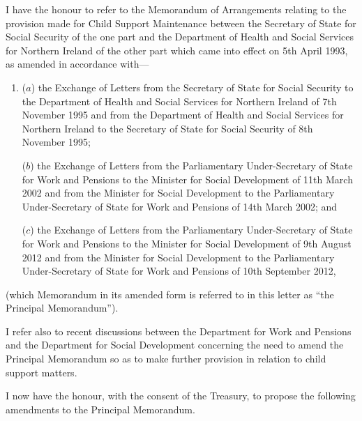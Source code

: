 \documentclass[12pt,a4paper]{article}
\begin{document}
I have the honour to refer to the Memorandum of Arrangements relating to the provision 
made for Child Support Maintenance between the Secretary of State for Social Security of 
the one part and the Department of Health and Social Services for Northern Ireland of the 
other part which came into effect on 5th April 1993, as amended in accordance with---
\begin{enumerate}\item[] 
($a$) the Exchange of Letters from the Secretary of State for Social Security to the 
Department of Health and Social Services for Northern Ireland of 7th November 
1995 and from the Department of Health and Social Services for Northern Ireland 
to the Secretary of State for Social Security of 8th November 1995;

($b$) the Exchange of Letters from the Parliamentary Under-Secretary of State for Work
and Pensions to the Minister for Social Development of 11th March 2002 and from
the Minister for Social Development to the Parliamentary Under-Secretary of State
for Work and Pensions of 14th March 2002; and

($c$) the Exchange of Letters from the Parliamentary Under-Secretary of State for Work
and Pensions to the Minister for Social Development of 9th August 2012 and from
the Minister for Social Development to the Parliamentary Under-Secretary of State
for Work and Pensions of 10th September 2012,
\end{enumerate}
(which Memorandum in its amended form is referred to in this letter as ``the Principal
Memorandum'').

I refer also to recent discussions between the Department for Work and Pensions and the
Department for Social Development concerning the need to amend the Principal
Memorandum so as to make further provision in relation to child support matters.

I now have the honour, with the consent of the Treasury, to propose the following amendments to the Principal Memorandum.
\end{document}

